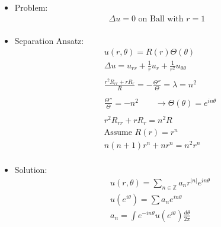 \documentclass[12pt, a4paper]{article}
\begin{document}
\begin{itemize}
    \item Problem:
    \begin{align*}
        \Delta u = 0 \text{ on Ball with }r = 1\\
    \end{align*}
    \item Separation Ansatz:
    \begin{align*}
        &u(r, \theta) = R(r)\Theta(\theta)\\
        &\Delta u = u_{rr} + \frac{1}{r}u_r+\frac{1}{r^2}u_{\theta\theta}\\\\
        &\frac{r^2R_{rr} + rR_r}{R} = -\frac{\Theta''}{\Theta} = \lambda = n^2\\\\
        &\frac{\Theta''}{\Theta} = -n^2\qquad \rightarrow \Theta(\theta) = e^{in\theta}\\\\
        &r^2R_{rr} + rR_r = n^2R\\
        &\text{Assume }R(r) = r^n\\
        &n(n+1)r^n + nr^n = n^2r^n\\
     \end{align*}
     \item Solution:
     \begin{align*}
        &u(r, \theta) = \sum_{n\in\mathbb{Z}}a_nr^{|n|}e^{in\theta}\\
        &u(e^{i\theta}) = \sum a_n e^{in\theta}\\
        &a_n = \int e^{-in\theta}u(e^{i\theta})\frac{d\theta}{2\pi}
     \end{align*}
\end{itemize}
\vspace{0.3em}
\end{document}
